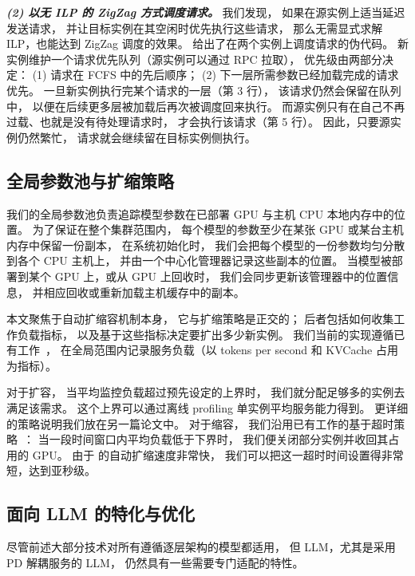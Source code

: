 \emph{\textbf{(2) 以无 ILP 的 ZigZag 方式调度请求。}}
我们发现，
如果在源实例上适当延迟发送请求，
并让目标实例在其空闲时优先执行这些请求，
那么无需显式求解 ILP，也能达到 ZigZag 调度的效果。
{} 给出了在两个实例上调度请求的伪代码。
新实例维护一个请求优先队列（源实例可以通过 RPC 拉取），
优先级由两部分决定：
(1) 请求在 FCFS 中的先后顺序；
(2) 下一层所需参数已经加载完成的请求优先。
一旦新实例执行完某个请求的一层（第 3 行），
该请求仍然会保留在队列中，
以便在后续更多层被加载后再次被调度回来执行。
而源实例只有在自己不再过载、也就是没有待处理请求时，
才会执行该请求（第 5 行）。
因此，只要源实例仍然繁忙，
请求就会继续留在目标实例侧执行。

\subsection{全局参数池与扩缩策略}
\label{sec:design-others}

我们的全局参数池负责追踪模型参数在已部署 GPU 与主机 CPU 本地内存中的位置。
为了保证在整个集群范围内，
每个模型的参数至少在某张 GPU 或某台主机内存中保留一份副本，
在系统初始化时，
我们会把每个模型的一份参数均匀分散到各个 CPU 主机上，
并由一个中心化管理器记录这些副本的位置。
当模型被部署到某个 GPU 上，或从 GPU 上回收时，
我们会同步更新该管理器中的位置信息，
并相应回收或重新加载主机缓存中的副本。

本文聚焦于自动扩缩容机制本身，
它与扩缩策略是正交的；
后者包括如何收集工作负载指标，
以及基于这些指标决定要扩出多少新实例。
我们当前的实现遵循已有工作~\cite{DBLP:conf/osdi/SunHZXZL024,K8S-HPA}，
在全局范围内记录服务负载（以 tokens per second 和 KVCache 占用为指标）。

对于扩容，
当平均监控负载超过预先设定的上界时，
我们就分配足够多的实例去满足该需求。
这个上界可以通过离线 profiling 单实例平均服务能力得到。
更详细的策略说明我们放在另一篇论文中。
对于缩容，
我们沿用已有工作的基于超时策略~\cite{DBLP:conf/usenix/Romero0YK21,DBLP:journals/corr/abs-2401-14351}：
当一段时间窗口内平均负载低于下界时，
我们便关闭部分实例并收回其占用的 GPU。
由于 {\sys} 的自动扩缩速度非常快，
我们可以把这一超时时间设置得非常短，达到亚秒级。

\subsection{面向 LLM 的特化与优化}
\label{sec:design-llm}

\noindent
尽管前述大部分技术对所有遵循逐层架构的模型都适用，
但 LLM，尤其是采用 PD 解耦服务的 LLM，
仍然具有一些需要专门适配的特性。

